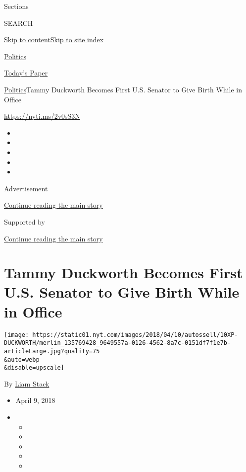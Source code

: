 Sections

SEARCH

\protect\hyperlink{site-content}{Skip to
content}\protect\hyperlink{site-index}{Skip to site index}

\href{https://www.nytimes.com/section/politics}{Politics}

\href{https://myaccount.nytimes.com/auth/login?response_type=cookie\&client_id=vi}{}

\href{https://www.nytimes.com/section/todayspaper}{Today's Paper}

\href{/section/politics}{Politics}\textbar{}Tammy Duckworth Becomes
First U.S. Senator to Give Birth While in Office

\url{https://nyti.ms/2v0sS3N}

\begin{itemize}
\item
\item
\item
\item
\item
\end{itemize}

Advertisement

\protect\hyperlink{after-top}{Continue reading the main story}

Supported by

\protect\hyperlink{after-sponsor}{Continue reading the main story}

\hypertarget{tammy-duckworth-becomes-first-us-senator-to-give-birth-while-in-office}{%
\section{Tammy Duckworth Becomes First U.S. Senator to Give Birth While
in
Office}\label{tammy-duckworth-becomes-first-us-senator-to-give-birth-while-in-office}}

\texttt{[image: https://static01.nyt.com/images/2018/04/10/autossell/10XP-DUCKWORTH/merlin\_135769428\_9649557a-0126-4562-8a7c-0151df7f1e7b-articleLarge.jpg?quality=75\\\&auto=webp\\\&disable=upscale]}

By \href{https://www.nytimes.com/by/liam-stack}{Liam Stack}

\begin{itemize}
\item
  April 9, 2018
\item
  \begin{itemize}
  \item
  \item
  \item
  \item
  \item
  \end{itemize}
\end{itemize}

